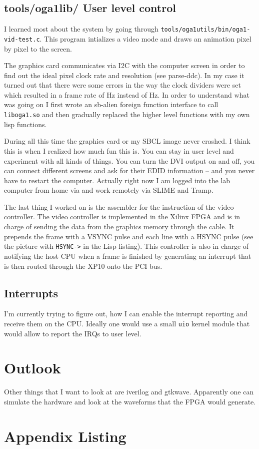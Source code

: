 \documentclass[twocolumn,DIV19]{scrartcl}
\begin{document}
\subsection{tools/oga1lib/ User level control}
I learned most about the system by going through
\verb!tools/oga1utils/bin/oga1-vid-test.c!. This program intializes a
video mode and draws an animation pixel by pixel to the screen.

The graphics card communicates via I2C with the computer screen in
order to find out the ideal pixel clock rate and resolution (see
parse-ddc). In my case it turned out that there were some errors in
the way the clock dividers were set which resulted in a frame rate of
\unit[47]{Hz} instead of \unit[60]{Hz}. In order to understand what
was going on I first wrote an sb-alien foreign function interface to
call \verb!liboga1.so! and then gradually replaced the higher level
functions with my own lisp functions.

During all this time the graphics card or my SBCL image never crashed.
I think this is when I realized how much fun this is. You can stay in
user level and experiment with all kinds of things. You can turn the
DVI output on and off, you can connect different screens and ask for
their EDID information -- and you never have to restart the
computer. Actually right now I am logged into the lab computer from
home via and work remotely via SLIME and Tramp.

The last thing I worked on is the assembler for the instruction of the
video controller. The video controller is implemented in the Xilinx
FPGA and is in charge of sending the data from the graphics memory
through the cable. It prepends the frame with a VSYNC pulse and each
line with a HSYNC pulse (see the picture with \verb!HSYNC->! in the
Lisp listing). This controller is also in charge of notifying the host
CPU when a frame is finished by generating an interrupt that is then
routed through the XP10 onto the PCI bus.

\subsection{Interrupts}
I'm currently trying to figure out, how I can enable the interrupt
reporting and receive them on the CPU. Ideally one would use a small
\verb!uio! kernel module that would allow to report the IRQs to user
level.


\section{Outlook}
Other things that I want to look at are iverilog and
gtkwave. Apparently one can simulate the hardware and look at the
waveforms that the FPGA would generate.

\section{Appendix Listing}
\end{document}
